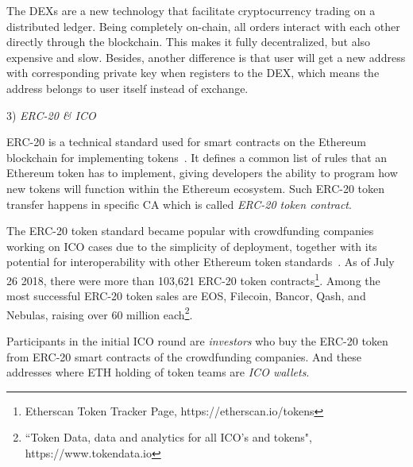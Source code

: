 
The DEXs are a new technology that facilitate cryptocurrency trading on a distributed ledger. Being completely on-chain, all orders interact with each other directly through the blockchain. This makes it fully decentralized, but also expensive and slow. Besides, another difference is that user will get a new address with corresponding private key when registers to the DEX, which means the address belongs to user itself instead of exchange. 
 



3) \emph{ERC-20 \& ICO}

ERC-20 is a technical standard used for smart contracts on the Ethereum blockchain for implementing tokens~\cite{erc-20-wiki}. It defines a common list of rules that an Ethereum token has to implement, giving developers the ability to program how new tokens will function within the Ethereum ecosystem. Such ERC-20 token transfer happens in specific CA which is called \emph{ERC-20 token contract}. %

The ERC-20 token standard became popular with crowdfunding companies working on ICO cases due to the simplicity of deployment, together with its potential for interoperability with other Ethereum token standards~\cite{erc-20}. As of July 26 2018, there were more than 103,621 ERC-20 token contracts\footnote{Etherscan Token Tracker Page, https://etherscan.io/tokens}. Among the most successful ERC-20 token sales are EOS, Filecoin, Bancor, Qash, and Nebulas, raising over 60 million each\footnote{``Token Data, data and analytics for all ICO's and tokens", https://www.tokendata.io}.

Participants in the initial ICO round are \emph{investors} who buy the ERC-20 token from ERC-20 smart contracts of the crowdfunding companies. And these addresses where ETH holding of token teams are \emph{ICO wallets}.

